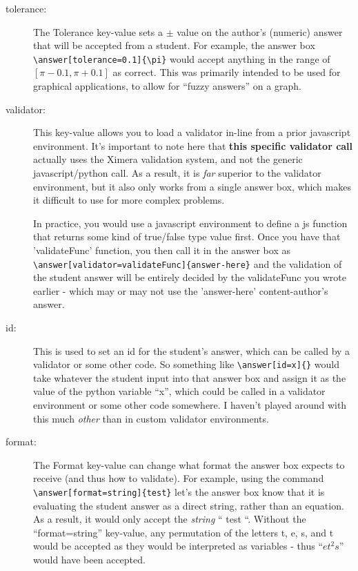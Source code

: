 \documentclass{ximera}
\begin{document}
        \begin{description}
            \item[tolerance:] The Tolerance key-value sets a $\pm$ value on the author's (numeric) answer that will be accepted from a student. For example, the answer box \verb|\answer[tolerance=0.1]{\pi}| would accept anything in the range of $[\pi-0.1,\pi+0.1]$ as correct. This was primarily intended to be used for graphical applications, to allow for ``fuzzy answers'' on a graph.
            
            \item[validator:] This key-value allows you to load a validator in-line from a prior javascript environment. It's important to note here that \textbf{this specific validator call} actually uses the Ximera validation system, and not the generic javascript/python call. As a result, it is \textit{far} superior to the validator environment, but it also only works from a single answer box, which makes it difficult to use for more complex problems. 
            
            In practice, you would use a javascript environment to define a js function that returns some kind of true/false type value first. Once you have that 'validateFunc' function, you then call it in the answer box as \verb|\answer[validator=validateFunc]{answer-here}| and the validation of the student answer will be entirely decided by the validateFunc you wrote earlier - which may or may not use the 'answer-here' content-author's answer.
            
            \item[id:] This is used to set an id for the student's answer, which can be called by a validator or some other code. So something like \verb|\answer[id=x]{}| would take whatever the student input into that answer box and assign it as the value of the python variable ``x'', which could be called in a validator environment or some other code somewhere. I haven't played around with this much \textit{other} than in custom validator environments.
            
            \item[format:] The Format key-value can change what format the answer box expects to receive (and thus how to validate). For example, using the command \verb|\answer[format=string]{test}| let's the answer box know that it is evaluating the student answer as a direct string, rather than an equation. As a result, it would only accept the \textit{string} `` test ``. Without the ``format=string'' key-value, any permutation of the letters t, e, s, and t would be accepted as they would be interpreted as variables - thus ``$et^2s$'' would have been accepted. 
            

\end{description}
\end{document}
